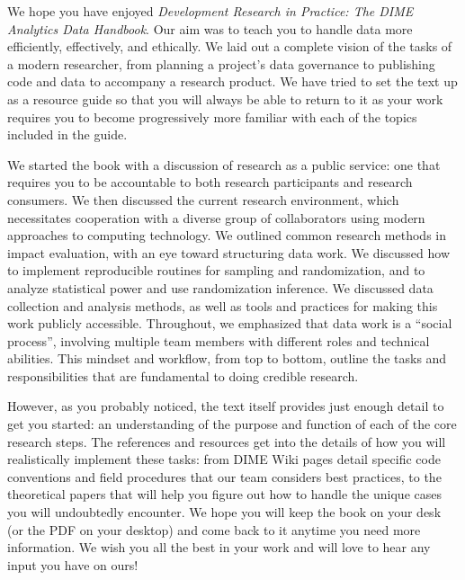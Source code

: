 We hope you have enjoyed \textit{Development Research in Practice: The DIME Analytics Data Handbook}.
Our aim was to teach you to handle data more efficiently, effectively, and ethically.
We laid out a complete vision of the tasks of a modern researcher,
from planning a project's data governance to publishing code and data
to accompany a research product.
We have tried to set the text up as a resource guide
so that you will always be able to return to it
as your work requires you to become progressively more familiar
with each of the topics included in the guide.

We started the book with a discussion of research as a public service:
one that requires you to be accountable to both research participants
and research consumers.
We then discussed the current research environment,
which necessitates cooperation with a diverse group of collaborators
using modern approaches to computing technology.
We outlined common research methods in impact evaluation,
with an eye toward structuring data work.
We discussed how to implement reproducible routines for sampling and randomization,
and to analyze statistical power and use randomization inference.
We discussed data collection
and analysis methods,
as well as tools and practices for making this work publicly accessible.
Throughout, we emphasized that data work is a ``social process'',
involving multiple team members with different roles and technical abilities.
This mindset and workflow, from top to bottom,
outline the tasks and responsibilities
that are fundamental to doing credible research.

However, as you probably noticed, the text itself provides
just enough detail to get you started:
an understanding of the purpose and function of each of the core research steps.
The references and resources get into the details
of how you will realistically implement these tasks:
from DIME Wiki pages detail specific code conventions
and field procedures that our team considers best practices,
to the theoretical papers that will help you figure out
how to handle the unique cases you will undoubtedly encounter.
We hope you will keep the book on your desk
(or the PDF on your desktop)
and come back to it anytime you need more information.
We wish you all the best in your work
and will love to hear any input you have on ours!
